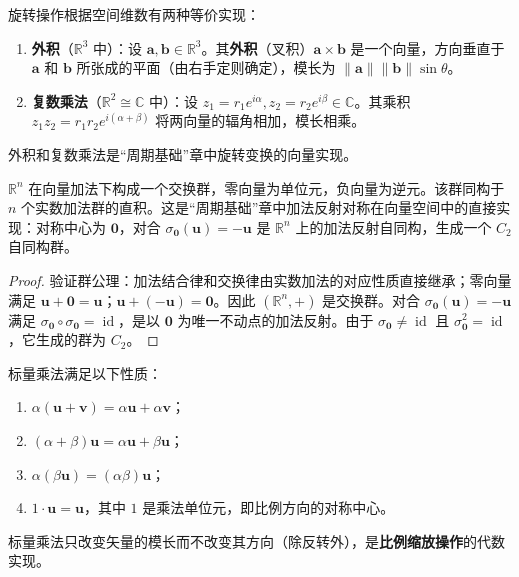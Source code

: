 \begin{definition}[外积与复数乘法——旋转]\label{def:outer_product_rotation}
旋转操作根据空间维数有两种等价实现：
\begin{enumerate}[label=(\roman*)]
    \item \textbf{外积}（$\mathbb{R}^3$ 中）：设 $\mathbf{a}, \mathbf{b} \in \mathbb{R}^3$。其\textbf{外积}（叉积）$\mathbf{a} \times \mathbf{b}$ 是一个向量，方向垂直于 $\mathbf{a}$ 和 $\mathbf{b}$ 所张成的平面（由右手定则确定），模长为 $\|\mathbf{a}\| \|\mathbf{b}\| \sin\theta$。
    \item \textbf{复数乘法}（$\mathbb{R}^2 \cong \mathbb{C}$ 中）：设 $z_1 = r_1 e^{i\alpha}, z_2 = r_2 e^{i\beta} \in \mathbb{C}$。其乘积 $z_1 z_2 = r_1 r_2 e^{i(\alpha+\beta)}$ 将两向量的辐角相加，模长相乘。
\end{enumerate}
外积和复数乘法是“周期基础”章中旋转变换的向量实现。
\end{definition}

\begin{proposition}\label{prop:vector_additive_group}
$\mathbb{R}^n$ 在向量加法下构成一个交换群，零向量为单位元，负向量为逆元。该群同构于 $n$ 个实数加法群的直积。这是“周期基础”章中加法反射对称在向量空间中的直接实现：对称中心为 $\mathbf{0}$，对合 $\sigma_{\mathbf{0}}(\mathbf{u}) = -\mathbf{u}$ 是 $\mathbb{R}^n$ 上的加法反射自同构，生成一个 $C_2$ 自同构群。
\end{proposition}

\begin{proof}
验证群公理：加法结合律和交换律由实数加法的对应性质直接继承；零向量满足 $\mathbf{u} + \mathbf{0} = \mathbf{u}$；$\mathbf{u} + (-\mathbf{u}) = \mathbf{0}$。因此 $(\mathbb{R}^n, +)$ 是交换群。对合 $\sigma_{\mathbf{0}}(\mathbf{u}) = -\mathbf{u}$ 满足 $\sigma_{\mathbf{0}} \circ \sigma_{\mathbf{0}} = \operatorname{id}$，是以 $\mathbf{0}$ 为唯一不动点的加法反射。由于 $\sigma_{\mathbf{0}} \neq \operatorname{id}$ 且 $\sigma_{\mathbf{0}}^2 = \operatorname{id}$，它生成的群为 $C_2$。
\end{proof}

\begin{proposition}\label{prop:scalar_multiplication}
标量乘法满足以下性质：
\begin{enumerate}[label=(\roman*)]
    \item $\alpha(\mathbf{u} + \mathbf{v}) = \alpha\mathbf{u} + \alpha\mathbf{v}$；
    \item $(\alpha + \beta)\mathbf{u} = \alpha\mathbf{u} + \beta\mathbf{u}$；
    \item $\alpha(\beta\mathbf{u}) = (\alpha\beta)\mathbf{u}$；
    \item $1 \cdot \mathbf{u} = \mathbf{u}$，其中 $1$ 是乘法单位元，即比例方向的对称中心。
\end{enumerate}
标量乘法只改变矢量的模长而不改变其方向（除反转外），是\textbf{比例缩放操作}的代数实现。
\end{proposition}

